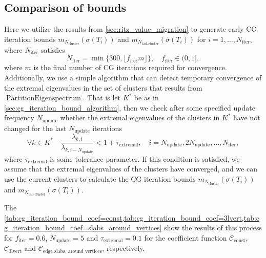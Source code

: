 \subsection{Comparison of bounds}\label{sec:comparison_of_bounds}
Here we utilize the results from \cref{sec:ritz_value_migration} to generate early CG iteration bounds $m_{N_{\text{cluster}}}(\sigma(T_i))$ and $m_{N_{\text{tail-cluster}}}(\sigma(T_i))$ for $i=1,\ldots,N_{\text{iter}}$, where $N_{\text{iter}}$ satisfies
\[
    N_{\text{iter}} = \min\{300, \lfloor f_{\text{iter}} m \rfloor\}, \quad f_{\text{iter}} \in (0,1],
\]
where $m$ is the final number of CG iterations required for convergence. Additionally, we use a simple algorithm that can detect temporary convergence of the extremal eigenvalues in the set of clusters that results from $\operatorname{PartitionEigenspectrum}$. That is let $K^*$ be as in \cref{sec:cg_iteration_bound_algorithm}, then we check after some specified update frequency $N_{\text{update}}$ whether the extremal eigenvalues of the clusters in $K^*$ have not changed for the last $N_{\text{update}}$ iterations
\begin{equation}
    \forall k \in K^* \quad \frac{\lambda_{k, i}}{\lambda_{k, i-N_{\text{update}}}} < 1+\tau_{\text{extremal}}, \quad i = N_{\text{update}}, 2N_{\text{update}}, \ldots, N_{\text{iter}},
    \label{eq:extremal_eigenvalue_convergence_condition}
\end{equation}
where $\tau_{\text{extremal}}$ is some tolerance parameter. If this condition is satisfied, we assume that the extremal eigenvalues of the clusters have converged, and we can use the current clusters to calculate the CG iteration bounds $m_{N_{\text{cluster}}}(\sigma(T_i))$ and $m_{N_{\text{tail-cluster}}}(\sigma(T_i))$.

The \cref{tab:cg_iteration_bound_coef=const,tab:cg_iteration_bound_coef=3lvert,tab:cg_iteration_bound_coef=slabs_around_vertices} show the results of this process for $f_{\text{iter}} = 0.6$, $N_{\text{update}} = 5$ and $\tau_{\text{extremal}} = 0.1$ for the coefficient function $\mathcal{C}_{\text{const}}$, $\mathcal{C}_{\text{3lvert}}$ and $\mathcal{C}_{\text{edge slabs, around vertices}}$, respectively.





